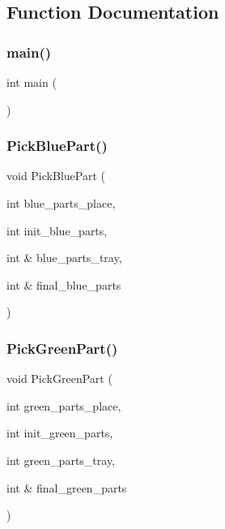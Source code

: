 \subsection{Function Documentation}
\mbox{\label{main_8cpp_ae66f6b31b5ad750f1fe042a706a4e3d4}} 
\subsubsection{main()}
{\footnotesize\ttfamily int main (\begin{DoxyParamCaption}{ }\end{DoxyParamCaption})}

\mbox{\label{main_8cpp_a278b4eee3b5925ea77aad0ddcdfee1d8}} 
\subsubsection{Pick\+Blue\+Part()}
{\footnotesize\ttfamily void Pick\+Blue\+Part (\begin{DoxyParamCaption}\item[{int}]{blue\+\_\+parts\+\_\+place,  }\item[{int}]{init\+\_\+blue\+\_\+parts,  }\item[{int \&}]{blue\+\_\+parts\+\_\+tray,  }\item[{int \&}]{final\+\_\+blue\+\_\+parts }\end{DoxyParamCaption})}

\mbox{\label{main_8cpp_ab7b860a161a0954e9e697d355dde70e0}} 
\subsubsection{Pick\+Green\+Part()}
{\footnotesize\ttfamily void Pick\+Green\+Part (\begin{DoxyParamCaption}\item[{int}]{green\+\_\+parts\+\_\+place,  }\item[{int}]{init\+\_\+green\+\_\+parts,  }\item[{int}]{green\+\_\+parts\+\_\+tray,  }\item[{int \&}]{final\+\_\+green\+\_\+parts }\end{DoxyParamCaption})}

